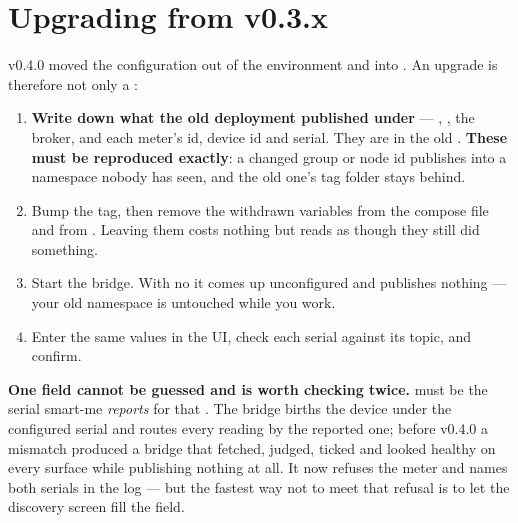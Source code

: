 \section{Upgrading from v0.3.x}
\label{sec:install-upgrade}

v0.4.0 moved the configuration out of the environment and into
. An upgrade is therefore not only a :

\begin{enumerate}
  \item \textbf{Write down what the old deployment published under} --- ,
        , the broker, and each meter's id, device id and serial. They
        are in the old . \textbf{These must be reproduced exactly}: a
        changed group or node id publishes into a namespace nobody has seen, and the
        old one's tag folder stays behind.
  \item Bump the  tag, then remove the withdrawn variables from the
        compose file and from . Leaving them costs nothing but reads as
        though they still did something.
  \item Start the bridge. With no  it comes up unconfigured and
        publishes nothing --- your old namespace is untouched while you work.
  \item Enter the same values in the UI, check each serial against its topic, and
        confirm.
\end{enumerate}

\begin{note}
\textbf{One field cannot be guessed and is worth checking twice.}  must
be the serial smart-me \emph{reports} for that . The bridge births
the device under the configured serial and routes every reading by the reported one;
before v0.4.0 a mismatch produced a bridge that fetched, judged, ticked and looked
healthy on every surface while publishing nothing at all. It now refuses the meter
and names both serials in the log --- but the fastest way not to meet that refusal is
to let the discovery screen fill the field.
\end{note}
